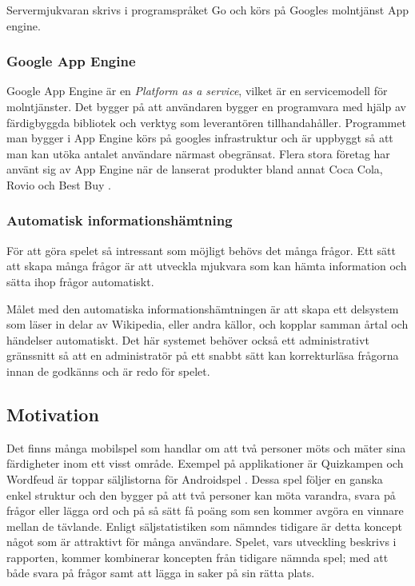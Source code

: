 \documentclass[12pt,a4paper]{article}
\begin{document}
Servermjukvaran skrivs i programspråket Go \cite{golang} och körs på Googles molntjänst App engine.

\subsubsection{Google App Engine} 
Google App Engine är en \textit{Platform as a service}, vilket är en servicemodell för molntjänster. Det bygger på att användaren bygger en programvara med hjälp av färdigbyggda bibliotek och verktyg som leverantören tillhandahåller. Programmet man bygger i App Engine körs på googles infrastruktur och är uppbyggt så att man kan utöka antalet användare närmast obegränsat. Flera stora företag har använt sig av App Engine när de lanserat produkter bland annat Coca Cola, Rovio och Best Buy \cite{googleappenginecustomers}. 

\subsubsection{Automatisk informationshämtning}
För att göra spelet så intressant som möjligt behövs det många frågor. Ett sätt att skapa många frågor är att utveckla mjukvara som kan hämta information och sätta ihop frågor automatiskt. 

Målet med den automatiska informationshämtningen är att skapa ett delsystem som läser in delar av Wikipedia, eller andra källor, och kopplar samman årtal och händelser automatiskt. Det här systemet behöver också ett administrativt gränssnitt så att en administratör på ett snabbt sätt kan korrekturläsa frågorna innan de godkänns och är redo för spelet.

\subsection{Motivation}
Det finns många mobilspel som handlar om att två personer möts och mäter sina färdigheter inom ett visst område. Exempel på applikationer är Quizkampen och Wordfeud är toppar säljlistorna för Androidspel \cite{appsalesrating}. Dessa spel följer en ganska enkel struktur och den bygger på att två personer kan möta varandra, svara på frågor eller lägga ord och på så sätt få poäng som sen kommer avgöra en vinnare mellan de tävlande. Enligt säljstatistiken som nämndes tidigare är detta koncept något som är attraktivt för många användare. Spelet, vars utveckling beskrivs i rapporten, kommer kombinerar koncepten från tidigare nämnda spel; med att både svara på frågor samt att lägga in saker på sin rätta plats. 
\end{document}

